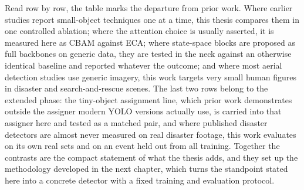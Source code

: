 Read row by row, the table marks the departure from prior work. Where earlier
studies report small-object techniques one at a time, this thesis compares them
in one controlled ablation; where the attention choice is usually asserted, it
is measured here as CBAM against ECA; where state-space blocks are proposed as
full backbones on generic data, they are tested in the neck against an
otherwise identical baseline and reported whatever the outcome; and where most
aerial detection studies use generic imagery, this work targets very small
human figures in disaster and search-and-rescue scenes. The last two rows
belong to the extended phase: the tiny-object assignment line, which prior
work demonstrates outside the assigner modern YOLO versions actually use, is
carried into that assigner here and tested as a matched pair, and where
published disaster detectors are almost never measured on real disaster
footage, this work evaluates on its own real sets and on an event held out
from all training. Together the contrasts are the compact statement of what
the thesis adds, and they set up the methodology developed in the next
chapter, which turns the standpoint stated here into a concrete detector with
a fixed training and evaluation protocol.
